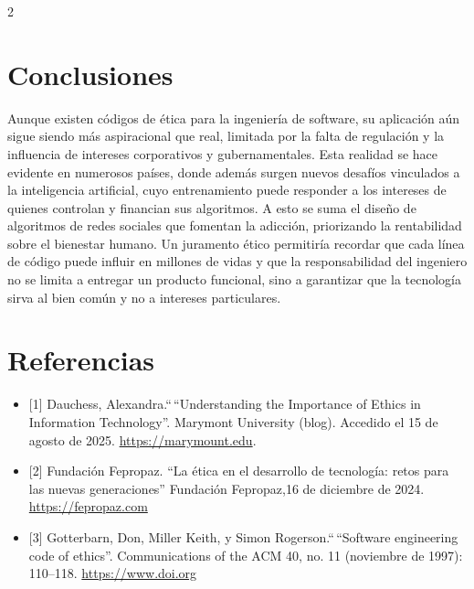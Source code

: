 \documentclass[12pt,spanish,Letterpaper,openany]{book}
\begin{document}
\begin {multicols}{2}
\bigskip
\bigskip

\section{Conclusiones}\label{conclusiones-9}

Aunque existen códigos de ética para la ingeniería de software, su aplicación aún sigue siendo más aspiracional que real, limitada por la falta de regulación y la influencia de intereses corporativos y gubernamentales. Esta realidad se hace evidente en numerosos países, donde además surgen nuevos desafíos vinculados a la inteligencia artificial, cuyo entrenamiento puede responder a los intereses de quienes controlan y financian sus algoritmos. A esto se suma el diseño de algoritmos de redes sociales que fomentan la adicción, priorizando la rentabilidad sobre el bienestar humano. Un juramento ético permitiría recordar que cada línea de código puede influir en millones de vidas y que la responsabilidad del ingeniero no se limita a entregar un producto funcional, sino a garantizar que la tecnología sirva al bien común y no a intereses particulares.

\section{Referencias}\label{referencias-9}

\begin{itemize}
\item
  {[}1{]} Dauchess, Alexandra.``\,``Understanding the Importance of Ethics in Information Technology''. Marymont University (blog). Accedido el 15 de agosto de 2025. \href{https://marymount.edu/blog/understanding-the-importance-of-ethics-in-information-technology/}{https://marymount.edu}.
\item
  {[}2{]} Fundación Fepropaz. ``La ética en el desarrollo de tecnología: retos para las nuevas generaciones'' Fundación Fepropaz,16 de diciembre de 2024. \href{https://fepropaz.com/etica-y-tech/}{https://fepropaz.com}
\item
  {[}3{]} Gotterbarn, Don, Miller Keith, y Simon Rogerson.``\,``Software engineering code of ethics''. Communications of the ACM 40, no. 11 (noviembre de 1997): 110--118. \href{https://www.doi.org\%5Dhttps://doi.org/10.1145/265684.265699}{https://www.doi.org}
\end{itemize}

\end {multicols}
\end{document}
